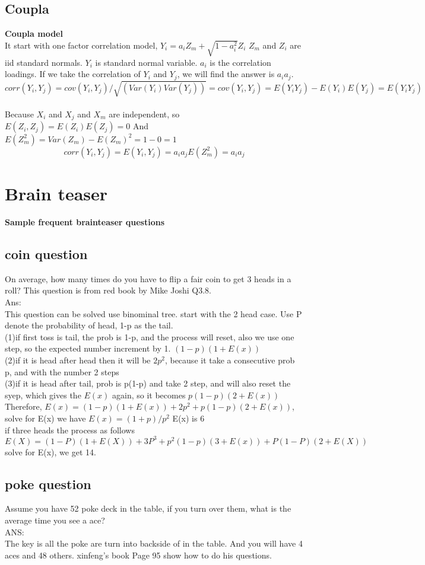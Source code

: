 \documentclass[a4paper,11pt]{article}
\begin{document}
\subsection{Coupla}
{\bf Coupla model}\\
It start with one factor correlation model, $Y_i=a_iZ_m+\sqrt {1-a_i^2}Z_i$ $Z_m$ and $Z_i$ are iid standard normals.
$Y_i$ is standard normal variable. $a_i$ is the correlation loadings. If we take the correlation of $Y_i$ and $Y_j$, we will find the answer is $a_i a_j$.
$$
corr(Y_i,Y_j)=cov(Y_i,Y_j)/\sqrt {(Var(Y_i)Var(Y_j))}=cov(Y_i,Y_j)=E(Y_iY_j)-E(Y_i)E(Y_j)=E(Y_i Y_j)
$$\\
Because $X_i$ and $X_j$ and $X_m$ are independent, so $E(Z_i,Z_j)=E(Z_i)E(Z_j)=0$ And $E(Z_m^2)=Var(Z_m)-E(Z_m)^2=1-0=1$
$$
corr(Y_i,Y_j)=E(Y_i,Y_j)=a_ia_jE(Z_m^2)=a_ia_j
$$
\section{Brain teaser}
{\bf Sample frequent brainteaser questions}\\
\subsection{coin question}
On average, how many times do you have to flip a fair coin to get 3 heads in a roll?
This question is from red book by Mike Joshi Q3.8.\\
Ans:\\
This question can be solved use binominal tree. start with the 2 head case. Use P denote the probability of head, 1-p as the tail.\\
(1)if first toss is tail, the prob is 1-p, and the process will reset, also we use one step, so the expected number increment by 1. $(1-p)(1+E(x))$\\
(2)if it is head after head then it will be $2p^2$, because it take a consecutive prob p, and with the number 2 steps\\
(3)if it is head after tail, prob is p(1-p) and take 2 step, and will also reset the syep, which gives the $E(x)$ again, so it becomes $p(1-p)(2+E(x))$\\
Therefore, $E(x)=(1-p)(1+E(x))+2p^2+p(1-p)(2+E(x))$, solve for E(x) we have $E(x)=(1+p)/p^2$ E(x) is 6\\
if three heads the process as follows $E(X)=(1-P)(1+E(X))+3P^3+p^2(1-p)(3+E(x))+P(1-P)(2+E(X))$ solve for E(x), we get 14.\\
\subsection{poke question}
Assume you have 52 poke deck in the table, if you turn over them, what is the average time you see a ace?\\
ANS:\\
The key is all the poke are turn into backside of in the table. And you will have 4 aces and 48 others. xinfeng's book Page 95 show how to do his questions.\\




\end{document}
